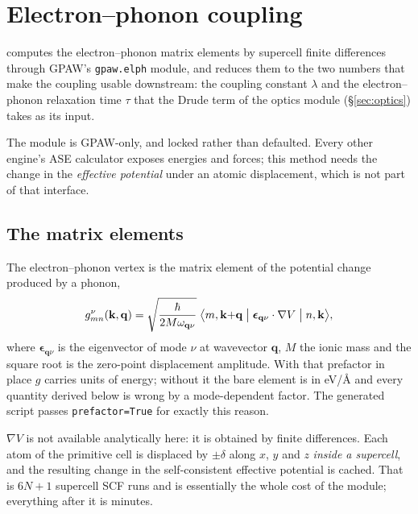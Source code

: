 \chapter{Electron--phonon coupling}
\label{ch:elph}

\menusep{} computes the
electron--phonon matrix elements by supercell finite differences through
GPAW's \texttt{gpaw.elph} module, and reduces them to the two numbers that make
the coupling usable downstream: the coupling constant $\lambda$ and the
electron--phonon relaxation time $\tau$ that the Drude term of the optics
module (\S\ref{sec:optics}) takes as its input.

The module is GPAW-only, and locked rather than defaulted. Every other engine's
ASE calculator exposes energies and forces; this method needs the change in the
\emph{effective potential} under an atomic displacement, which is not part of
that interface.

\section{The matrix elements}

The electron--phonon vertex is the matrix element of the potential change
produced by a phonon,
\begin{equation}
  g_{mn}^{\nu}(\mathbf{k},\mathbf{q})
    = \sqrt{\frac{\hbar}{2 M \omega_{\mathbf{q}\nu}}}\;
      \bigl\langle m,\mathbf{k}{+}\mathbf{q} \bigm|
      \boldsymbol{\epsilon}_{\mathbf{q}\nu}\cdot\nabla V
      \bigm| n,\mathbf{k} \bigr\rangle ,
  \label{eq:elph-g}
\end{equation}
where $\boldsymbol{\epsilon}_{\mathbf{q}\nu}$ is the eigenvector of mode $\nu$
at wavevector $\mathbf{q}$, $M$ the ionic mass and the square root is the
zero-point displacement amplitude. With that prefactor in place $g$ carries
units of energy; without it the bare element is in eV/\AA{} and every quantity
derived below is wrong by a mode-dependent factor. The generated script passes
\texttt{prefactor=True} for exactly this reason.

$\nabla V$ is not available analytically here: it is obtained by finite
differences. Each atom of the primitive cell is displaced by $\pm\delta$ along
$x$, $y$ and $z$ \emph{inside a supercell}, and the resulting change in the
self-consistent effective potential is cached. That is $6N+1$ supercell SCF
runs and is essentially the whole cost of the module; everything after it is
minutes.

